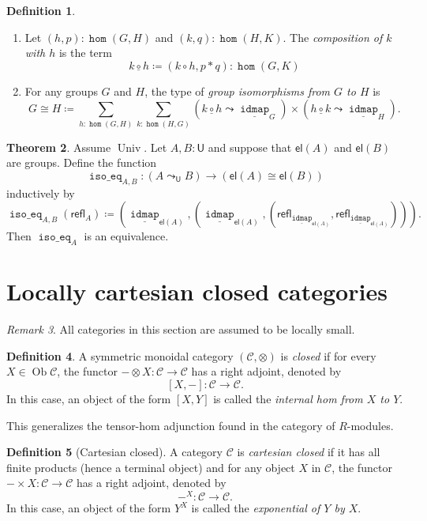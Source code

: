 \documentclass[10pt,letterpaper,cm]{nupset}
\theoremstyle{definition}
\newtheorem{definition}{Definition}[subsection]
\theoremstyle{theorem}
\newtheorem{theorem}[definition]{Theorem}
\theoremstyle{remark}
\newtheorem{remark}[definition]{Remark}
\DeclareMathOperator{\ob}{Ob}
\newcommand{\refl}{\mathsf{refl}}
\newcommand{\U}{\mathsf{U}}
\newcommand{\el}{\mathsf{el}}
\newcommand{\0}{\mathbf{0}}
\newcommand{\1}{\mathbf{1}}
\newcommand{\2}{\mathbf{2}}
\DeclareMathOperator{\idmap}{\mathtt{idmap}}
\DeclareMathOperator{\isoeq}{\mathtt{iso\_eq}}
\DeclareMathOperator{\homm}{\mathtt{hom}}
\DeclareMathOperator{\univ}{\mathrm{Univ}}
\renewcommand{\c}{\mathscr{C}}
\newcommand{\be}{\begin{enumerate}}
\newcommand{\ee}{\end{enumerate}}
\begin{document}
\begin{definition} $ $
\be
\item Let $\left(h, p\right) : \homm(G, H)$ and $\left(k, q\right): \homm(H, K)$. The \textit{composition of $k$ with $h$} is the term
 $$k \underline{\circ} h \coloneqq (k \circ h, p \ast q) : \homm(G, K)$$
\item For any groups $G$ and $H$, the type of \textit{group isomorphisms from $G$ to $H$} is 
\[
G\cong H \coloneqq 
\sum_{h : \homm(G, H)} \sum_{k : \homm(H, G)}\left(k \underline{\circ} h \leadsto \underline{\idmap}_{G}\right) \times\left(h \underline{\circ} k \leadsto \underline{\idmap}_{H}\right)
. \]
\ee 
\end{definition} 

\begin{theorem}
Assume $\univ$. Let $A, B :\U$ and suppose that $\el(A)$ and $\el(B)$ are groups. Define the function $$\isoeq_{A,B} : (A \leadsto_{\U} B) \to (\el(A) \cong \el(B))$$ inductively by $$\isoeq_{A,B}(\refl_A) \coloneqq \left(\underline{\idmap}_{\el(A)}, \left(\underline{\idmap}_{\el(A)}, \left(\refl_{\underline{\idmap}_{\el(A)}}, \refl_{\underline{\idmap}_{\el(A)}}\right)\right)\right).$$ Then $\isoeq_A$ is an equivalence. 
\end{theorem}

\section{Locally cartesian closed categories}\label{LCC}

\begin{remark}
All categories in this section are assumed to be locally small.
\end{remark}

\begin{definition}\label{tens-hom}
A symmetric monoidal category $\left(\c, \otimes\right)$ is \textit{closed} if for every $X\in \ob{\c}$, the functor ${-}\otimes X: \c \to \c$ has a right adjoint, denoted by
\[
\left[X, {-}\right] : \c \to \c.
\] In this case, an object of the form $\left[X, Y\right]$ is called the \textit{internal hom from $X$ to $Y$}.
\end{definition}

This generalizes the tensor-hom adjunction found in the category of $R$-modules.

\smallskip

\begin{definition}[Cartesian closed]
A category $\c$ is \textit{cartesian closed} if it has all finite products (hence a terminal object) and for any object $X$ in $\c$, the functor $ {-} \times X : \c \to \c   $ has a  right adjoint,  denoted by $${-}^X : \c \to \c.$$ In this case, an object of the form $Y^X$ is called the \textit{exponential of $Y$ by $X$}.
\end{definition}
\end{document}
